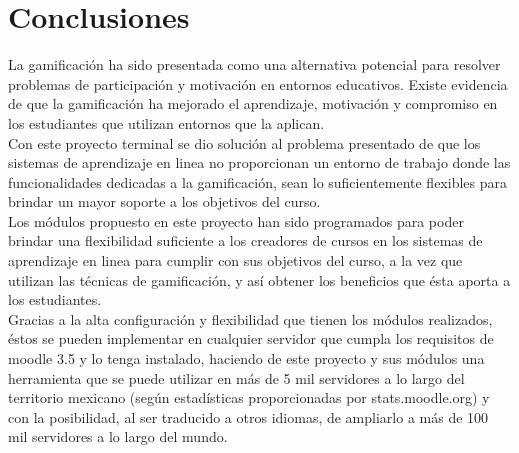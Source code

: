 \chapter{Conclusiones} \label{ch:conclusiones}

\noindent La gamificación ha sido presentada como una alternativa potencial para resolver problemas de participación
y motivación en entornos educativos. Existe evidencia de que la gamificación ha mejorado el aprendizaje, motivación
y compromiso en los estudiantes que utilizan entornos que la aplican.\\

\noindent Con este proyecto terminal se dio solución al problema presentado de que los sistemas de aprendizaje en linea no proporcionan
un entorno de trabajo donde las funcionalidades dedicadas a la gamificación, sean lo suficientemente flexibles
para brindar un mayor soporte a los objetivos del curso.\\

\noindent Los módulos propuesto en este proyecto han sido programados para poder brindar una flexibilidad suficiente a los
creadores de cursos en los sistemas de aprendizaje en linea para cumplir con sus objetivos del curso, a la vez
que utilizan las técnicas de gamificación, y así obtener los beneficios que ésta aporta a los estudiantes.\\

\noindent Gracias a la alta configuración y flexibilidad que tienen los módulos realizados, éstos se pueden implementar en cualquier
servidor que cumpla los requisitos de moodle 3.5 y lo tenga instalado, haciendo de este proyecto y sus módulos una herramienta que se puede utilizar
en más de 5 mil servidores a lo largo del territorio mexicano (según estadísticas proporcionadas por stats.moodle.org) y con la posibilidad,
al ser traducido a otros idiomas, de ampliarlo a más de 100 mil servidores a lo largo del mundo.
